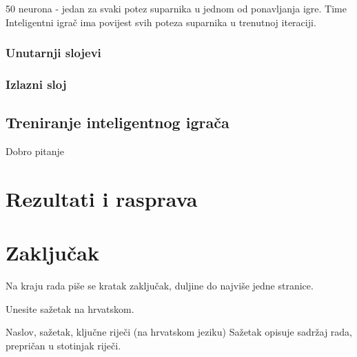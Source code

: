 \documentclass[zavrsnirad]{fer}
\begin{document}
	50 neurona - jedan za svaki potez suparnika u jednom od ponavljanja igre. Time Inteligentni igrač ima povijest svih poteza suparnika u trenutnoj iteraciji.

\subsection{Unutarnji slojevi}

\subsection{Izlazni sloj}

\section{Treniranje inteligentnog igrača}

	Dobro pitanje



\chapter{Rezultati i rasprava}
\label{pog:rezultati_i_rasprava}



\chapter{Zaključak}
\label{pog:zakljucak}

Na kraju rada piše se kratak zaključak, duljine do najviše jedne stranice. 








\begin{sazetak}
  Unesite sažetak na hrvatskom.

	Naslov, sažetak, ključne riječi (na hrvatskom jeziku)
	Sažetak opisuje sadržaj rada, prepričan u stotinjak riječi. 

\end{sazetak}
\end{document}
